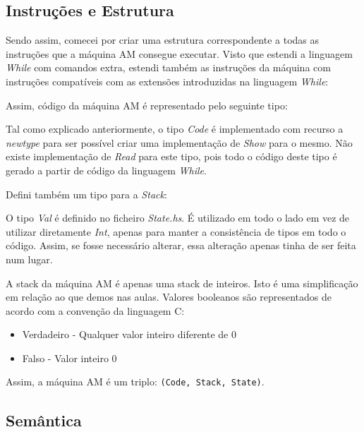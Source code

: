 \documentclass[11pt,a4paper]{report}
\newcommand{\while}[0]{\textit{While}\xspace}
\newcommand{\classshow}[0]{\textit{Show}\xspace}
\newcommand{\classread}[0]{\textit{Read}\xspace}
\begin{document}
\subsection{Instruções e Estrutura} \label{subsection:estrutura-maquina-am}

\par Sendo assim, comecei por criar uma estrutura correspondente a todas as instruções que a máquina AM consegue executar. Visto que estendi a linguagem \while com comandos extra, estendi também as instruções da máquina com instruções compatíveis com as extensões introduzidas na linguagem \while:

\par Assim, código da máquina AM é representado pelo seguinte tipo:

\par Tal como explicado anteriormente, o tipo \textit{Code} é implementado com recurso a \textit{newtype} para ser possível criar uma implementação de \classshow para o mesmo. Não existe implementação de \classread para este tipo, pois todo o código deste tipo é gerado a partir de código da linguagem \while.

\par Defini também um tipo para a \textit{Stack}:

\par O tipo \textit{Val} é definido no ficheiro \textit{State.hs}. É utilizado em todo o lado em vez de utilizar diretamente \textit{Int}, apenas para manter a consistência de tipos em todo o código. Assim, se fosse necessário alterar, essa alteração apenas tinha de ser feita num lugar.

\par A stack da máquina AM é apenas uma stack de inteiros. Isto é uma simplificação em relação ao que demos nas aulas. Valores booleanos são representados de acordo com a convenção da linguagem C:
\begin{itemize}
    \item Verdadeiro - Qualquer valor inteiro diferente de 0
    \item Falso - Valor inteiro 0
\end{itemize}

\par Assim, a máquina AM é um triplo: \texttt{(Code, Stack, State)}.

\subsection{Semântica} \label{subsection:semantica-maquina-am}
\end{document}
